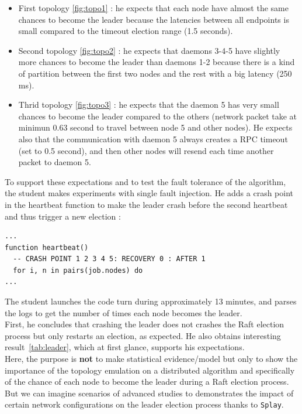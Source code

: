\documentclass{eplmastersthesis}
\begin{document}
          \begin{itemize}
            \item First topology \ref{fig:topo1} : he expects that each node
            have almost the same chances to become the leader because the
            latencies between all endpoints is small compared to the timeout
            election range (1.5 seconds).
            \item Second topology \ref{fig:topo2} : he expects that daemons
            3-4-5 have slightly more chances to become the leader
            than daemons 1-2 because there is a kind of partition between the
            first two nodes and the rest with a big latency (250 ms).
            \item Thrid topology \ref{fig:topo3} : he expects that the daemon
            5 has very small chances to become the leader compared to the
            others (network packet take at minimun 0.63 second to travel between node 5 and other nodes).
            He expects also that the communication with daemon 5 always
            creates a RPC timeout (set to 0.5 second), and then other nodes will resend each
            time another packet to daemon 5.
          \end{itemize}

          To support these expectations and to test the fault tolerance of
          the algorithm, the student makes experiments with single fault
          injection. He adds a crash point in the heartbeat function to
          make the leader crash before the second heartbeat and
          thus trigger a new election :

          \begin{lstlisting}[style=MyLua]
...
function heartbeat()
  -- CRASH POINT 1 2 3 4 5: RECOVERY 0 : AFTER 1
  for i, n in pairs(job.nodes) do
...
          \end{lstlisting}

          The student launches the code turn during approximately 13 minutes,
          and parses the logs to get the number of times each node becomes the
          leader.\\
          First, he concludes that crashing the leader does not crashes the
          Raft election process but only restarts an election, as expected.
          He also obtains interesting result~\ref{tab:leader}, which at first glance,
          supports his expectations. \\
          Here, the purpose is \textbf{not} to make statistical evidence/model but
          only to show the importance of the topology emulation on a
          distributed algorithm and specifically of the chance of each node
          to become the leader during a Raft election process.\\
          But we can imagine scenarios of advanced studies to demonstrates
          the impact of certain network configurations on the leader election
          process thanks to \texttt{Splay}.\\
\end{document}
